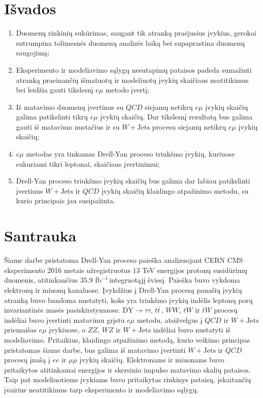 \documentclass[a4paper, 12pt, oneside]{article}
\newcommand{\emu}{e\mu}
\newcommand{\WJets}{W\! +\!\mathrm{Jets}}
\newcommand{\DYtau}{\mathrm{DY} \! \rightarrow \! \tau\tau}
\newcommand{\invfb}{fb$^{-1}\,$}
\newcommand{\QCD}{QC\! D}
\begin{document}
\section{Išvados}
\begin{enumerate}
	\item Duomenų rinkinių sukūrimas, saugant tik atranką praėjusius įvykius, gerokai sutrumpina tolimesnės duomenų analizės
	laiką bei supaprastina duomenų saugojimą;
	\item Eksperimento ir modeliavimo sąlygų nesutapimų pataisos padeda sumažinti atranką praeinančių išmatuotų ir modeliuotų
	įvykių skaičiaus neatitikimus bei leidžia gauti tikslesnį $\emu$ metodo įvertį;
	\item Iš matavimo duomenų įvertinus su $QCD$ siejamų netikrų $\emu$ įvykių skaičių galima patikslinti tikrų $\emu$ įvykių
	skaičių. Dar tikslesnį rezultatą bus galima gauti iš matavimo nustačius ir su $W+\mathrm{Jets}$ procesu siejamų netikrų
	$\emu$ įvykių skaičių;
	\item $\emu$ metodas yra tinkamas Drell-Yan proceso triukšmo įvykių, kuriuose sukuriami tikri leptonai, skaičiaus įvertinimui;
	\item Drell-Yan proceso triukšmo įvykių skaičių bus galima dar labiau patikslinti įvertinus $\WJets$ ir $\QCD$ įvykių skaičių
	klaidingo atpažinimo metodu, su kurio principais jau susipažinta.
\end{enumerate}


\section*{Santrauka}
Šiame darbe pristatoma Drell-Yan proceso paieška analizuojant CERN CMS eksperimento 2016 metais užregistruotus
$13$ TeV energijos protonų susidūrimų duomenis, atitinkančius $35.9$ \invfb integruotąjį šviesį.
Paieška buvo vykdoma elektronų ir miuonų kanaluose.
Įvykdžius į Drell-Yan procesą panašių įvykių atranką buvo bandoma nustatyti, koks yra triukšmo įvykių indėlis
leptonų porų invariantinės masės pasiskirstymuose.
$\DYtau$, $t\bar{t}\,$, $WW$, $tW$ ir $\bar{t}W$ procesų indėliai buvo įvertinti matavimu grįstu $\emu$ metodu,
atsižvelgus į $QCD$ ir $W+\mathrm{Jets}$ priemaišas $\emu$ įvykiuose, o $ZZ$, $WZ$ ir $W+\mathrm{Jets}$ indėliai buvo nustatyti
iš modeliavimo.
Pritaikius, klaidingo atpažinimo metodą, kurio veikimo principas pristatomas šiame darbe, bus galima iš matavimo įvertinti
$\WJets$ ir $\QCD$ procesų įnašą į $ee$ ir $\mu\mu$ įvykių skaičių.
Elektronams ir miuonams buvo pritaikytos atitinkamai energijos ir skersinio impulso matavimo skalių pataisos.
Taip pat modeliuotiems įvykiams buvo pritaikytas rinkinys pataisų, įskaitančių įvairius neatitikimus tarp eksperimento
ir modeliavimo sąlygų.





\end{document}
